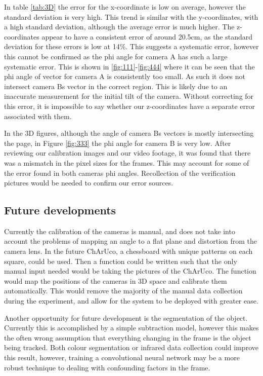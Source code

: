 \documentclass{article}
\begin{document}
In table \ref{tab:3D} the error for the x-coordinate is low on average, however the standard deviation is very high. This trend is similar with the y-coordinates, with a high standard deviation, although the average error is much higher. The z-coordinates appear to have a consistent error of around 20.5cm, as the standard deviation for these errors is low at 14\%. This suggests a systematic error, however this cannot be confirmed as the phi angle for camera A has such a large systematic error. This is shown in \ref{fig:111}-\ref{fig:444} where it can be seen that the phi angle of vector for camera A is consistently too small. As such it does not intersect camera Bs vector in the correct region. This is likely due to an inaccurate measurement for the initial tilt of the camera. Without correcting for this error, it is impossible to say whether our z-coordinates have a separate error associated with them. 

In the 3D figures, although the angle of camera Bs vectors is mostly intersecting the page, in Figure \ref{fig:333} the phi angle for camera B is very low. After reviewing our calibration images and our video footage, it was found that there was a mismatch in the pixel sizes for the frames. This may account for some of the error found in both cameras phi angles. Recollection of the verification pictures would be needed to confirm our error sources. 

\subsection{Future developments}
Currently the calibration of the cameras is manual, and does not take into account the problems of mapping an angle to a flat plane and distortion from the camera lens. In the future ChArUco, a chessboard with unique patterns on each square, could be used. Then a function could be written such that the only manual input needed would be taking the pictures of the ChArUco. The function would map the positions of the cameras in 3D space and calibrate them automatically. This would remove the majority of the manual data collection during the experiment, and allow for the system to be deployed with greater ease. 

Another opportunity for future development is the segmentation of the object. Currently this is accomplished by a simple subtraction model, however this makes the often wrong assumption that everything changing in the frame is the object being tracked. Both colour segmentation or infrared data collection could improve this result, however, training a convolutional neural network may be a more robust technique to dealing with confounding factors in the frame.\cite{CNN} 
\end{document}
